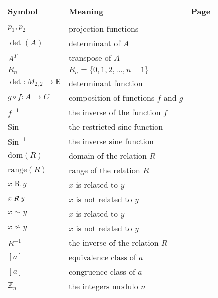 \begin{tabular}{p{1in} p{2.5in} l}
\textbf{Symbol}              &  \textbf{Meaning}  &  \textbf{Page} \\
        &           &       \\ 
$p_1, p_2$            &  projection functions                 &  \pageref{sym:projfunc}  \\
$\det ( A )$ &  determinant of $A$           &  \pageref{sym:determinant}  \\
$A^T $               &  transpose of $A$                &  \pageref{sym:transpose}  \\
$R_n$      & $R_n = \{0, 1, 2, \ldots, n-1 \}$ & \pageref{page:R_n} \\
$\det :M_{2, 2}  \to \mathbb{R}$  &  determinant function  &  \pageref{sym:detfunc}  \\
$g \circ f:A \to C$  &  composition of functions $f$ and $g$  &  \pageref{sym:composition}  \\
$f^{ - 1} $          &  the inverse of the function $f$       &  \pageref{sym:finverse}  \\
Sin                  &  the restricted sine function         &  \pageref{sym:restrictsine}  \\
$\text{Sin}^{ - 1}$  &  the inverse sine function            &  \pageref{sym:inversesine}  \\
$\text{dom} ( R )$  &  domain of the relation $R$  &  \pageref{sym:domrel}  \\
$\text{range} ( R )$ & range of the relation $R$   &  \pageref{sym:domrel}  \\
$x \mathrel{R} y$   &  $x$ is related to $y$                  &  \pageref{sym:xrelatedy}  \\
$x \mathrel{\not \negthickspace R} y$  &  $x$ is not related to $y$ & \pageref{sym:xrelatedy}  \\
$x \sim y$   &  $x$ is related to $y$                  &  \pageref{sym:xtwiddley}  \\
$x \nsim y$  &  $x$ is not related to $y$              & \pageref{sym:xtwiddley}  \\
$R^{-1}$     &  the inverse of the relation $R$        &  \pageref{sym:Rinverse}  \\
$\left[ a \right]$  &  equivalence class of $a$        &  \pageref{sym:equivclass}  \\
$\left[ a \right]$  &  congruence class of $a$        &  \pageref{sym:conclass}  \\
$\mathbb{Z}_{n} $   &  the integers modulo $n$        &  \pageref{sym:integersmodn}  \\

\end{tabular}
